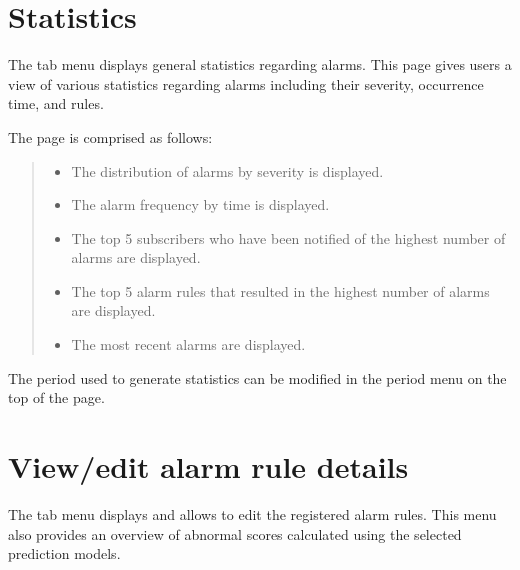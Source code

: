 \documentclass[letterpaper,10pt,english]{sphinxmanual}
\begin{document}
\chapter{Statistics}
\label{\detokenize{anomaly/part03/index:statistics}}\label{\detokenize{anomaly/part03/index:id1}}\label{\detokenize{anomaly/part03/index::doc}}
The  tab menu displays general statistics regarding alarms. This page gives users a view of various statistics regarding alarms including their severity, occurrence time, and rules.

The page is comprised as follows:
\begin{quote}

\begin{figure}[H]
\centering

\noindent{}
\end{figure}
\begin{itemize}
\item {} 
 The distribution of alarms by severity is displayed.

\item {} 
 The alarm frequency by time is displayed.

\item {} 
 The top 5 subscribers who have been notified of the highest number of alarms are displayed.

\item {} 
 The top 5 alarm rules that resulted in the highest number of alarms are displayed.

\item {} 
 The most recent alarms are displayed.

\end{itemize}
\end{quote}

The period used to generate statistics can be modified in the period menu on the top of the page.
\begin{quote}

\begin{figure}[H]
\centering

\noindent{}
\end{figure}
\end{quote}


\chapter{View/edit alarm rule details}
\label{\detokenize{anomaly/part04/index:id1}}\label{\detokenize{anomaly/part04/index::doc}}
The  tab menu displays and allows to edit the registered alarm rules. This menu also provides an overview of abnormal scores calculated using the selected prediction models.
\end{document}
